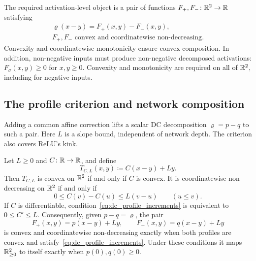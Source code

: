 The required activation-level object is a pair of functions $F_+,F_-\colon\mathbb{R}^2\to\mathbb{R}$ satisfying
\begin{equation}
    \begin{gathered}
    \varrho(x-y)=F_+(x,y)-F_-(x,y),\\
    F_+,F_-\text{ convex and coordinatewise non-decreasing}.
    \end{gathered}
    \label{eq:general_dc_pair}
\end{equation}
Convexity and coordinatewise monotonicity ensure convex composition. In addition, non-negative inputs must produce non-negative decomposed activations: $F_\sigma(x,y)\ge0$ for $x,y\ge0$. Convexity and monotonicity are required on all of $\mathbb{R}^2$, including for negative inputs.

\subsection{The profile criterion and network composition}

Adding a common affine correction lifts a scalar DC decomposition $\varrho=p-q$ to such a pair. Here $L$ is a slope bound, independent of network depth. The criterion also covers ReLU's kink.

\begin{proposition}\label{prop:dc_profile_lift}
Let $L\ge0$ and $C\colon\mathbb{R}\to\mathbb{R}$, and define
\begin{equation}
    T_{C,L}(x,y)\coloneqq C(x-y)+Ly.
    \label{eq:dc_profile_lift}
\end{equation}
Then $T_{C,L}$ is convex on $\mathbb{R}^2$ if and only if $C$ is convex. It is coordinatewise non-decreasing on $\mathbb{R}^2$ if and only if
\begin{equation}
    0\le C(v)-C(u)\le L(v-u)\qquad(u\le v).
    \label{eq:dc_profile_increments}
\end{equation}
If $C$ is differentiable, condition~\eqref{eq:dc_profile_increments} is equivalent to $0\le C'\le L$. Consequently, given $p-q=\varrho$, the pair
\begin{equation}
    F_+(x,y)=p(x-y)+Ly,
    \qquad F_-(x,y)=q(x-y)+Ly
    \label{eq:asymmetric_dc_pair}
\end{equation}
is convex and coordinatewise non-decreasing exactly when both profiles are convex and satisfy~\eqref{eq:dc_profile_increments}. Under these conditions it maps $\mathbb{R}^2_{\ge0}$ to itself exactly when $p(0),q(0)\ge0$.
\end{proposition}

